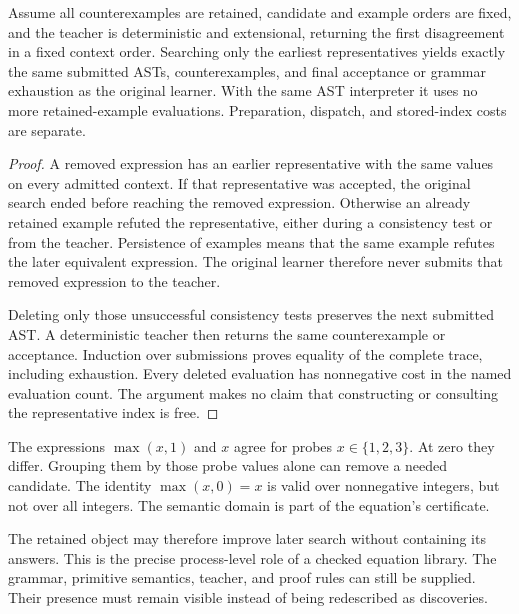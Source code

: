 \begin{theorem}\label{r:ordered}
Assume all counterexamples are retained, candidate and example orders are fixed, and the teacher is deterministic and extensional, returning the first disagreement in a fixed context order. Searching only the earliest representatives yields exactly the same submitted ASTs, counterexamples, and final acceptance or grammar exhaustion as the original learner. With the same AST interpreter it uses no more retained-example evaluations. Preparation, dispatch, and stored-index costs are separate.
\end{theorem}
\begin{proof}
A removed expression has an earlier representative with the same values on every admitted context. If that representative was accepted, the original search ended before reaching the removed expression. Otherwise an already retained example refuted the representative, either during a consistency test or from the teacher. Persistence of examples means that the same example refutes the later equivalent expression. The original learner therefore never submits that removed expression to the teacher.

Deleting only those unsuccessful consistency tests preserves the next submitted AST. A deterministic teacher then returns the same counterexample or acceptance. Induction over submissions proves equality of the complete trace, including exhaustion. Every deleted evaluation has nonnegative cost in the named evaluation count. The argument makes no claim that constructing or consulting the representative index is free.
\end{proof}

\begin{counterexample}\label{ce:probe}
The expressions $\max(x,1)$ and $x$ agree for probes $x\in\{1,2,3\}$. At zero they differ. Grouping them by those probe values alone can remove a needed candidate. The identity $\max(x,0)=x$ is valid over nonnegative integers, but not over all integers. The semantic domain is part of the equation's certificate.
\end{counterexample}

The retained object may therefore improve later search without containing its answers. This is the precise process-level role of a checked equation library. The grammar, primitive semantics, teacher, and proof rules can still be supplied. Their presence must remain visible instead of being redescribed as discoveries.

